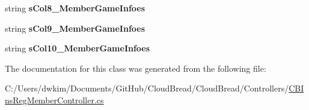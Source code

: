 \begin{DoxyCompactItemize}
\item 
string {\bfseries s\+Col8\+\_\+\+Member\+Game\+Infoes}\hypertarget{class_cloud_bread_1_1_controllers_1_1_c_b_ins_reg_member_controller_1_1_input_params_a483124bc270bea748f6729cdcc8070ea}{}\label{class_cloud_bread_1_1_controllers_1_1_c_b_ins_reg_member_controller_1_1_input_params_a483124bc270bea748f6729cdcc8070ea}

\item 
string {\bfseries s\+Col9\+\_\+\+Member\+Game\+Infoes}\hypertarget{class_cloud_bread_1_1_controllers_1_1_c_b_ins_reg_member_controller_1_1_input_params_ac872d54a0e24f2337be5f264eb0cfe4c}{}\label{class_cloud_bread_1_1_controllers_1_1_c_b_ins_reg_member_controller_1_1_input_params_ac872d54a0e24f2337be5f264eb0cfe4c}

\item 
string {\bfseries s\+Col10\+\_\+\+Member\+Game\+Infoes}\hypertarget{class_cloud_bread_1_1_controllers_1_1_c_b_ins_reg_member_controller_1_1_input_params_a35f578b922f38aa8d3760e5f8c623fc3}{}\label{class_cloud_bread_1_1_controllers_1_1_c_b_ins_reg_member_controller_1_1_input_params_a35f578b922f38aa8d3760e5f8c623fc3}

\end{DoxyCompactItemize}


The documentation for this class was generated from the following file\+:\begin{DoxyCompactItemize}
\item 
C\+:/\+Users/dwkim/\+Documents/\+Git\+Hub/\+Cloud\+Bread/\+Cloud\+Bread/\+Controllers/\hyperlink{_c_b_ins_reg_member_controller_8cs}{C\+B\+Ins\+Reg\+Member\+Controller.\+cs}\end{DoxyCompactItemize}
